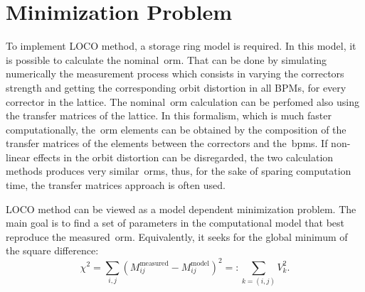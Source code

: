 


\section{Minimization Problem}
To implement LOCO method, a storage ring model is required. In this model, it is possible to calculate the nominal~\gls{orm}. That can be done by simulating numerically the measurement process which consists in varying the correctors strength and getting the corresponding orbit distortion in all BPMs, for every corrector in the lattice. The nominal~\gls{orm} calculation can be perfomed also using the transfer matrices of the lattice. In this formalism, which is much faster computationally, the~\gls{orm} elements can be obtained by the composition of the transfer matrices of the elements between the correctors and the~\gls{bpm}s. If non-linear effects in the orbit distortion can be disregarded, the two calculation methods produces very similar~\gls{orm}s, thus, for the sake of sparing computation time, the transfer matrices approach is often used.

LOCO method can be viewed as a model dependent minimization problem. The main goal is to find a set of parameters in the computational model that best reproduce the measured~\gls{orm}. Equivalently, it seeks for the global minimum of the square difference:
\begin{equation}
    \chi^2 = \sum_{i, j} \left(M^{\mathrm{measured}}_{ij} - M^{\mathrm{model}}_{ij}\right)^2 =: \sum_{{k = (i,j)}} V_{k}^2.
    \label{eq:chi2}
\end{equation}

